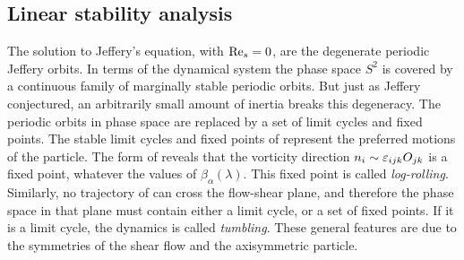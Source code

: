 \documentclass[thesis.tex]{subfiles}
\begin{document}
\subsection*{Linear stability analysis}

The solution to Jeffery's equation,  with $\textrm{Re}_s=0$, are the degenerate periodic Jeffery orbits. In terms of the dynamical system  the phase space $S^2$ is covered by a continuous family of marginally stable periodic orbits. But just as Jeffery conjectured, an arbitrarily small amount of inertia breaks this degeneracy. The periodic orbits in phase space are replaced by a set of limit cycles and fixed points. The stable limit cycles and fixed points of  represent the preferred motions of the particle. The form of  reveals that the vorticity direction $n_i \sim \varepsilon_{ijk}O_{jk}$ is a fixed point, whatever the values of $\beta_\alpha(\lambda)$. This fixed point is called \emph{log-rolling}. Similarly, no trajectory of  can cross the flow-shear plane, and therefore the phase space in that plane must contain either a limit cycle, or a set of fixed points. If it is a limit cycle, the dynamics is called \emph{tumbling}. These general features are due to the symmetries of the shear flow and the axisymmetric particle. 
\end{document}
